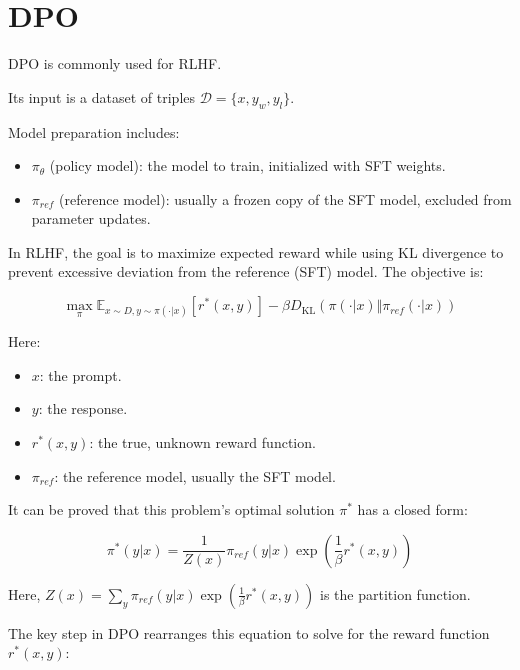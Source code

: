 \setcounter{section}{1}

\hypertarget{dpo}{%
\section{DPO}\label{dpo}}

DPO is commonly used for RLHF.

Its input is a dataset of triples \(\mathcal{D}=\{x,y_w,y_l\}\).

Model preparation includes:

\begin{itemize}
\tightlist
\item
  \(\pi_\theta\) (policy model): the model to train, initialized with SFT weights.
\item
  \(\pi_{ref}\) (reference model): usually a frozen copy of the SFT model, excluded from parameter updates.
\end{itemize}

In RLHF, the goal is to maximize expected reward while using KL divergence to prevent excessive deviation from the reference (SFT) model. The objective is:

\[
\max_{\pi}\mathbb{E}_{x\sim D,y\sim\pi(\cdot|x)}[r^*(x,y)]-\beta D_{\mathrm{KL}}(\pi(\cdot|x)\Vert\pi_{ref}(\cdot|x))
\]

Here:

\begin{itemize}
\tightlist
\item
  \(x\): the prompt.
\item
  \(y\): the response.
\item
  \(r^*(x,y)\): the true, unknown reward function.
\item
  \(\pi_{ref}\): the reference model, usually the SFT model.
\end{itemize}

It can be proved that this problem's optimal solution \(\pi^*\) has a closed form:

\[
\pi^*(y|x)=\frac{1}{Z(x)}\pi_{ref}(y|x)\exp\left(\frac{1}{\beta}r^*(x,y)\right)
\]

Here, \(Z(x)=\sum_y\pi_{ref}(y|x)\exp\left(\frac{1}{\beta}r^*(x,y)\right)\) is the partition function.

The key step in DPO rearranges this equation to solve for the reward function \(r^*(x,y)\):

